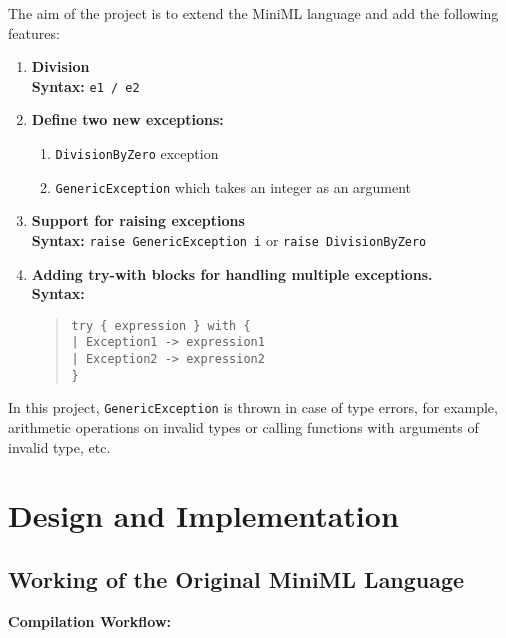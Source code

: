 \documentclass[a4paper,12pt]{article}
\begin{document}
The aim of the project is to extend the MiniML language and add the following features:

\begin{enumerate}[left=0.5cm]
    \item \textbf{Division} \\
    \textbf{Syntax:} \texttt{e1 / e2}
    
    \item \textbf{Define two new exceptions:}
    \begin{enumerate}[left=0.5cm]
        \item \texttt{DivisionByZero} exception
        \item \texttt{GenericException} which takes an integer as an argument
    \end{enumerate}
    
    \item \textbf{Support for raising exceptions} \\
    \textbf{Syntax:} \texttt{raise GenericException i} \quad or \quad \texttt{raise DivisionByZero}
    
    \item \textbf{Adding try-with blocks for handling multiple exceptions.} \\
    \textbf{Syntax:}
    \begin{quote}
    \texttt{try \{ expression \} with \{ }\\
    \hspace*{1em}\texttt{| Exception1 -> expression1 }\\
    \hspace*{1em}\texttt{| Exception2 -> expression2 }\\
    \texttt{\}}
    \end{quote}
\end{enumerate}

In this project, \texttt{GenericException} is thrown in case of type errors, for example, arithmetic operations on invalid types or calling functions with arguments of invalid type, etc.

\section{Design and Implementation}
\subsection{Working of the Original MiniML Language}

\textbf{Compilation Workflow:}
\end{document}
